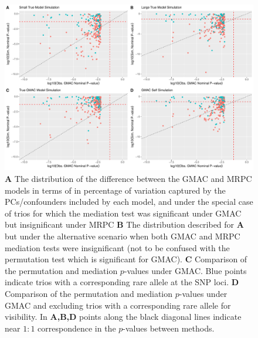 \documentclass[
]{article}
\begin{document}
\begin{figure}
\centering
\includegraphics{GMACwriteup2_files/figure-latex/unnamed-chunk-5-1.pdf}
\caption{\textbf{A} The distribution of the difference between the GMAC
and MRPC models in terms of in percentage of variation captured by the
PCs/confounders included by each model, and under the special case of
trios for which the mediation test was significant under GMAC but
insignificant under MRPC \textbf{B} The distribution described for
\textbf{A} but under the alternative scenario when both GMAC and MRPC
mediation tests were insignificant (not to be confused with the
permutation test which is significant for GMAC). \textbf{C} Comparison
of the permutation and mediation \(p\)-values under GMAC. Blue points
indicate trios with a corresponding rare allele at the SNP loci.
\textbf{D} Comparison of the permutation and mediation \(p\)-values
under GMAC and excluding trios with a corresponding rare allele for
visibility. In \textbf{A,B,D} points along the black diagonal lines
indicate near \(1:1\) correspondence in the \(p\)-values between
methods.}
\end{figure}
\end{document}
